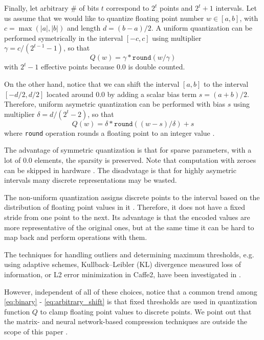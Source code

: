 \documentclass{article}
\begin{document}
Finally, let arbitrary \# of bits $t$ correspond to $2^t$ points and $2^t+1$ intervals. Let us assume that we would like to quantize floating point number $w \in [a,b]$, with $c = \max(|a|,|b|)$ and length $d = (b - a)/2$. A uniform quantization can be performed symetrically in the interval $[-c,c]$ using multiplier $\gamma  = c/(2^{t-1}-1)$, so that
\begin{equation}
Q(w) = \gamma * \texttt{round}( w / \gamma )
\label{eq:arbitrary}
\end{equation}
with $2^t-1$ effective points because $0.0$ is double counted.

On the other hand, notice that we can shift the interval $[a,b]$ to the interval $[-d/2,d/2]$ located around $0.0$ by adding a scalar bias term $s = (a+b)/2$. Therefore, uniform asymetric quantization can be performed with bias $s$ using multiplier $\delta  = d/(2^{t}-2)$, so that
\begin{equation}
Q(w) = \delta * \texttt{round}( (w-s)/ \delta ) + s
\label{eq:arbitrary_shift}
\end{equation}
where \texttt{round} operation rounds a floating point to an integer value \cite{Wen2016,Jacob2017,Krishnamoorthi2018}.

The advantage of symmetric quantization is that for sparse parameters, with a lot of $0.0$ elements, the sparsity is preserved. Note that computation with zeroes can be skipped in hardware \cite{Albericio2016, Venkatesh2016, Reagan2016, Chen2017, Kim2017, Parashar2017}. The disadvatage is that for highly asymetric intervals many discrete representations may be wasted.

The non-uniform quantization assigns discrete points to the interval based on the distribution of floating point values in it \cite{Bagherinezhad2017,Wang2018}. Therefore, it does not have a fixed stride from one point to the next. Its advantage is that the encoded values are more representative of the original ones, but at the same time it can be hard to map back and perform operations with them.

The techniques for handling outliers and determining maximum thresholds, e.g. using adaptive schemes, Kullback–Leibler (KL) divergence measured loss of information, or L2 error minimization in Caffe2, have been investigated in \cite{jia2014caffe,Migasz2017,Zhou2017,Park2018}.

However, independent of all of these choices, notice that a common trend among \eqref{eq:binary} - \eqref{eq:arbitrary_shift} is that fixed thresholds are used in quantization function $Q$ to clamp floating point values to discrete points. We point out that the matrix- and neural network-based compression techniques are outside the scope of this paper \cite{Gong2014,Denton2014,Jaderberg2014,Mishra2018}.
\end{document}

